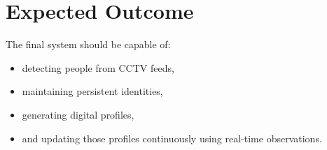 \documentclass[12pt,a4paper]{article}
\begin{document}
\section{Expected Outcome}

The final system should be capable of:
\begin{itemize}
    \item detecting people from CCTV feeds,
    \item maintaining persistent identities,
    \item generating digital profiles,
    \item and updating those profiles continuously using real-time observations.
\end{itemize}
\end{document}
